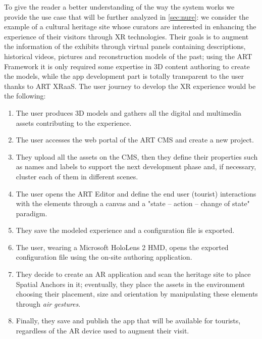 To give the reader a better understanding of the way the system works we provide the use case that will be further analyzed in \autoref{sec:nure}: we consider the example of a cultural heritage site whose curators are interested in enhancing the experience of their visitors through \gls{XR} technologies. Their goals is to augment the information of the exhibits through virtual panels containing descriptions, historical videos, pictures and reconstruction models of the past; using the ART Framework it is only required some expertise in 3D content authoring to create the models, while the app development part is totally transparent to the user thanks to ART XRaaS. The user journey to develop the \gls{XR} experience would be the following:
\begin{enumerate}
    \item The user produces 3D models and gathers all the digital and multimedia assets contributing to the experience.
    \item The user accesses the web portal of the ART CMS and create a new project.
    \item They upload all the assets on the CMS, then they define their properties such as names and labels to support the next development phase and, if necessary, cluster each of them in different scenes.
    \item The user opens the ART Editor and define the end user (tourist) interactions with the elements through a canvas and a "state – action – change of state" paradigm.
    \item They save the modeled experience and a configuration file is exported.
    \item The user, wearing a Microsoft HoloLens 2 \gls{HMD}, opens the exported configuration file using the on-site authoring application.
    \item They decide to create an \gls{AR} application and scan the heritage site to place Spatial Anchors in it; eventually, they place the assets in the environment choosing their placement, size and orientation by manipulating these elements through \emph{air gestures}.
    \item Finally, they save and publish the app that will be available for tourists, regardless of the \gls{AR} device used to augment their visit.
\end{enumerate}